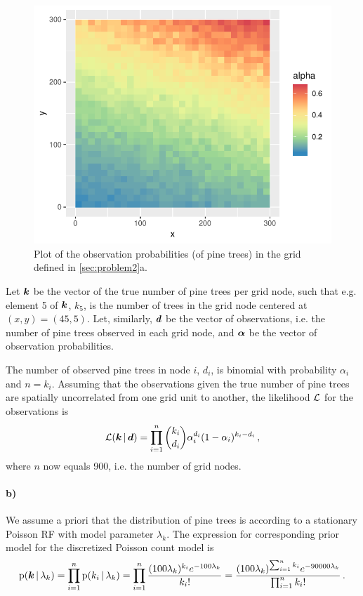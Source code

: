 \begin{figure}
    \centering
    \includegraphics{figures/p2_alpha.pdf}
    \caption{Plot of the observation probabilities (of pine trees) in the grid defined in \ref{sec:problem2}a.}
    \label{fig:p2_alpha}
\end{figure}

Let $\bm{k}$ be the vector of the true number of pine trees per grid node, such that e.g. element 5 of $\bm{k}$, $k_5$, is the number of trees in the grid node centered at $(x, y) = (45, 5)$. Let, similarly, $\bm{d}$ be the vector of observations, i.e. the number of pine trees observed in each grid node, and $\bm{\alpha}$ be the vector of observation probabilities.

The number of observed pine trees in node $i$, $d_i$, is binomial with probability $\alpha_i$ and $n = k_i$. Assuming that the observations given the true number of pine trees are spatially uncorrelated from one grid unit to another, the likelihood $\mathcal{L}$ for the observations is
%
\begin{equation*}
    \mathcal{L}(\bm{k} \, | \, \bm{d}) = \prod_{i=1}^n \binom{k_i}{d_i} \alpha_i^{d_i} (1 - \alpha_i)^{k_i - d_i} \, ,
\end{equation*}
%
where $n$ now equals 900, i.e. the number of grid nodes.

\paragraph{b)}
We assume a priori that the distribution of pine trees is according to a stationary Poisson RF with model parameter $\lambda_k$. The expression for corresponding prior model for the discretized Poisson count model is
%
\begin{equation*}
    \mathrm{p}(\bm{k} \, | \, \lambda_k) = \prod_{i=1}^n \mathrm{p}(k_i \, | \, \lambda_k) = \prod_{i=1}^n \frac{(100\lambda_k)^{k_i} e^{-100\lambda_k}}{k_i!} = \frac{(100\lambda_k)^{\sum_{i=1}^n k_i} e^{-90000\lambda_k}}{\prod_{i=1}^n k_i!} \, .
\end{equation*}


